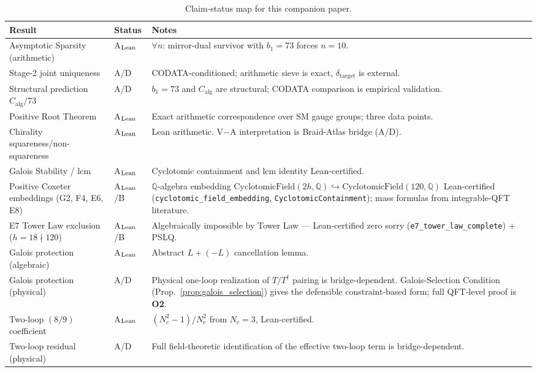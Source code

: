 \documentclass[11pt]{article}
\theoremstyle{remark}
\newcommand{\deltatar}{\delta_{\mathrm{target}}}
\newcommand{\Calg}{C_{\mathrm{alg}}}
\begin{document}
\begin{table}[H]
\centering
\caption{Claim-status map for this companion paper.}
\label{tab:companion_claim_map}
\small
\renewcommand{\arraystretch}{1.15}
\begin{tabularx}{\linewidth}{@{}p{3.6cm}p{2.1cm}X@{}}
\toprule
\textbf{Result} & \textbf{Status} & \textbf{Notes} \\
\midrule
Asymptotic Sparsity (arithmetic) & A$_{\rm Lean}$ & $\forall n$: mirror-dual survivor with $b_1=73$ forces $n=10$. \\
Stage-2 joint uniqueness & A/D & CODATA-conditioned; arithmetic sieve is exact, $\deltatar$ is external. \\
Structural prediction $\Calg/73$ & A/D & $b_1=73$ and $\Calg$ are structural; CODATA comparison is empirical validation. \\
Positive Root Theorem & A$_{\rm Lean}$ & Exact arithmetic correspondence over SM gauge groups; three data points. \\
Chirality squareness/non-squareness & A$_{\rm Lean}$ & Lean arithmetic. V$-$A interpretation is Braid-Atlas bridge (A/D). \\
Galois Stability / lcm & A$_{\rm Lean}$ & Cyclotomic containment and lcm identity Lean-certified. \\
Positive Coxeter embeddings (G2, F4, E6, E8) & A$_{\rm Lean}$/B & $\mathbb{Q}$-algebra embedding $\mathrm{CyclotomicField}(2h,\mathbb{Q})\hookrightarrow\mathrm{CyclotomicField}(120,\mathbb{Q})$ Lean-certified (\texttt{cyclotomic\_field\_embedding}, \texttt{CyclotomicContainment}); mass formulas from integrable-QFT literature. \\
E7 Tower Law exclusion ($h=18 \nmid 120$) & A$_{\rm Lean}$/B & Algebraically impossible by Tower Law — Lean-certified zero sorry (\texttt{e7\_tower\_law\_complete}) + PSLQ. \\
Galois protection (algebraic) & A$_{\rm Lean}$ & Abstract $L+(-L)$ cancellation lemma. \\
Galois protection (physical) & A/D & Physical one-loop realization of $T/T^\dagger$ pairing is bridge-dependent.  Galois-Selection Condition (Prop.~\ref{prop:galois_selection}) gives the defensible constraint-based form; full QFT-level proof is \textbf{O2}. \\
Two-loop $(8/9)$ coefficient & A$_{\rm Lean}$ & $(N_c^2-1)/N_c^2$ from $N_c=3$, Lean-certified. \\
Two-loop residual (physical) & A/D & Full field-theoretic identification of the effective two-loop term is bridge-dependent. \\

\end{tabularx}
\end{table}
\end{document}

